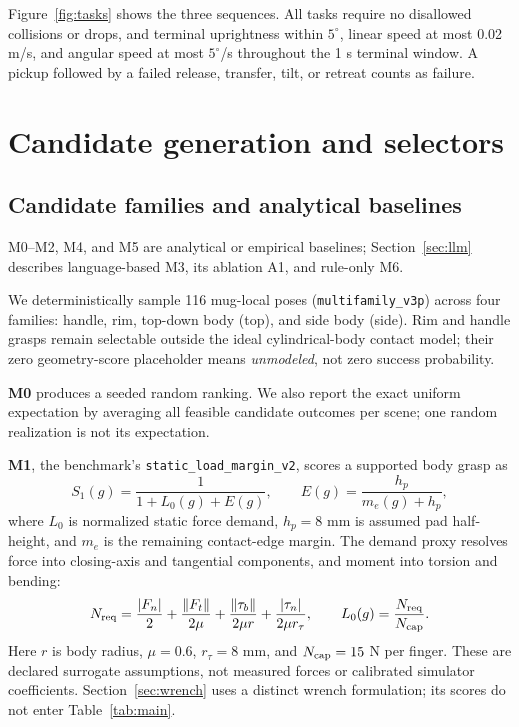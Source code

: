 \documentclass{article}
\newcommand{\code}[1]{\texttt{#1}}
\begin{document}
Figure~\ref{fig:tasks} shows the three sequences. All tasks require no disallowed collisions or drops, and terminal uprightness within $5^\circ$, linear speed at most 0.02 m/s, and angular speed at most $5^\circ$/s throughout the 1 s terminal window. A pickup followed by a failed release, transfer, tilt, or retreat counts as failure.

\section{Candidate generation and selectors}
\subsection{Candidate families and analytical baselines}
M0--M2, M4, and M5 are analytical or empirical baselines; Section~\ref{sec:llm} describes language-based M3, its ablation A1, and rule-only M6.

We deterministically sample 116 mug-local poses (\code{multifamily\_v3p}) across four families: handle, rim, top-down body (top), and side body (side). Rim and handle grasps remain selectable outside the ideal cylindrical-body contact model; their zero geometry-score placeholder means \emph{unmodeled}, not zero success probability.

\textbf{M0} produces a seeded random ranking. We also report the exact uniform expectation by averaging all feasible candidate outcomes per scene; one random realization is not its expectation.

\textbf{M1}, the benchmark's \code{static\_load\_margin\_v2}, scores a supported body grasp as
\begin{equation}
S_1(g)=\frac{1}{1+L_0(g)+E(g)},\qquad
E(g)=\frac{h_p}{m_e(g)+h_p},
\end{equation}
where $L_0$ is normalized static force demand, $h_p=8$ mm is assumed pad half-height, and $m_e$ is the remaining contact-edge margin. The demand proxy resolves force into closing-axis and tangential components, and moment into torsion and bending:
\begin{equation}
N_{\rm req}=\frac{|F_n|}{2}+\frac{\|F_t\|}{2\mu}
+\frac{\|\tau_b\|}{2\mu r}+\frac{|\tau_n|}{2\mu r_\tau},\qquad
L_0(g)=\frac{N_{\rm req}}{N_{\rm cap}}.
\end{equation}
Here $r$ is body radius, $\mu=0.6$, $r_\tau=8$ mm, and $N_{\rm cap}=15$ N per finger. These are declared surrogate assumptions, not measured forces or calibrated simulator coefficients. Section~\ref{sec:wrench} uses a distinct wrench formulation; its scores do not enter Table~\ref{tab:main}.
\end{document}
